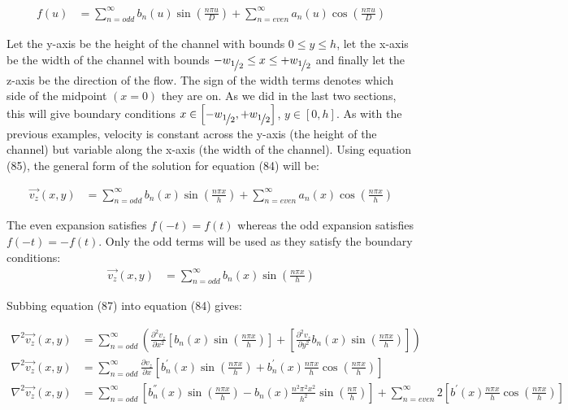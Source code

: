 \documentclass[titlepage]{article}
\begin{document}
    \begin{align}
        f\left(u\right) &= \sum_{n=odd}^{\infty}b_{n}\left(u\right)\sin(\displaystyle\frac{n\pi{u}}{D}) + \sum_{n=even}^{\infty}a_{n}\left(u\right)\cos(\displaystyle\frac{n\pi{u}}{D})
    \end{align}


    \noindent Let the y-axis be the height of the channel with bounds $0\leq{y}\leq{h}$, let the x-axis be the width of the channel with bounds $-w_{\displaystyle\nicefrac{1}{2}}\leq{x}\leq{+w_{\displaystyle\nicefrac{1}{2}}}$ and finally let the z-axis be the direction of the flow. The sign of the width terms denotes which side of the midpoint $\left(x=0\right)$ they are on. As we did in the last two sections, this will give boundary conditions $x \in \left[-w_{\displaystyle\nicefrac{1}{2}}, +w_{\displaystyle\nicefrac{1}{2}}\right]$, $y\in\left[0,h\right]$. As with the previous examples, velocity is constant across the y-axis (the height of the channel) but variable along the x-axis (the width of the channel). Using equation (85), the general form of the solution for equation (84) will be:

    \begin{align}
        \vec{v_{z}}\left(x,y\right) &= \sum_{n=odd}^{\infty}b_{n}\left(x\right)\sin(\displaystyle\frac{n\pi{x}}{h}) + \sum_{n=even}^{\infty}a_{n}\left(x\right)\cos(\displaystyle\frac{n\pi{x}}{h}) 
    \end{align}

    \noindent The even expansion satisfies $f\left(-t\right)=f\left(t\right)$ whereas the odd expansion satisfies $f\left(-t\right)=-f\left(t\right)$. Only the odd terms will be used as they satisfy the boundary conditions: 
    \begin{align}
        \vec{v_{z}}\left(x,y\right) &= \sum_{n=odd}^{\infty}b_{n}\left(x\right)\sin(\displaystyle\frac{n\pi{x}}{h})
    \end{align}

    \newpage

    \noindent Subbing equation (87) into equation (84) gives: 

    \begin{align}
        \nabla^2\vec{v_{z}}\left(x,y\right) &= \sum_{n=odd}^{\infty}\left(\displaystyle\frac{\partial^2{v_{z}}}{\partial{x}^2}\left[b_{n}\left(x\right)\sin(\displaystyle\frac{n\pi{x}}{h})\right] + \left[\displaystyle\frac{\partial^2{v_{z}}}{\partial{y}^2} b_{n}\left(x\right)\sin(\displaystyle\frac{n\pi{x}}{h})\right]\right) \\ 
        \nabla^2\vec{v_{z}}\left(x,y\right) &= \sum_{n=odd}^{\infty}\displaystyle\frac{\partial{v_{z}}}{\partial{x}}\left[b_{n}^{'}\left(x\right)\sin(\displaystyle\frac{n\pi{x}}{h})+b_{n}^{'}\left(x\right)\displaystyle\frac{n\pi{x}}{h}\cos(\displaystyle\frac{n\pi{x}}{h})\right] \\
        \nabla^2\vec{v_{z}}\left(x,y\right) &= \sum_{n=odd}^{\infty}\left[b_{n}^{''}\left(x\right)\sin(\displaystyle\frac{n\pi{x}}{h}) - b_{n}\left(x\right)\displaystyle\frac{n^{2}\pi^{2}x^{2}}{h^2}\sin(\displaystyle\frac{n\pi}{h})\right] + \sum_{n=even}^{\infty} 2\left[b^{'}\left(x\right)\displaystyle\frac{n\pi{x}}{h}\cos(\displaystyle\frac{n\pi{x}}{h})\right]
    \end{align}
\end{document}
